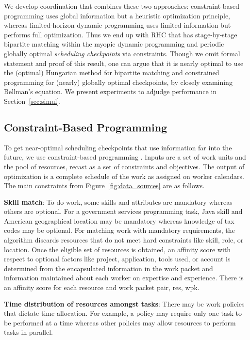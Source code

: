 \documentclass[10pt,journal,cspaper,compsoc]{IEEEtran}
\begin{document}
We develop coordination that combines these two approaches: 
constraint-based programming uses global information but a heuristic optimization principle, whereas 
limited-horizon dynamic programming uses limited information but performs full optimization.
Thus we end up with RHC that has stage-by-stage bipartite matching within the
myopic dynamic programming and periodic globally optimal \emph{scheduling checkpoints} via constraints.
Though we omit formal statement and proof of this result, one can argue  that 
it is nearly optimal to use the (optimal) Hungarian method for bipartite matching and constrained programming 
for (nearly) globally optimal checkpoints, by closely examining Bellman's equation.  We present experiments to adjudge 
performance in Section~\ref{sec:simul}. 

\subsection{Constraint-Based Programming}
To get near-optimal scheduling checkpoints that use information far into the future, we use 
constraint-based programming \cite{NavehRAGC2007,AsafERCGOM2010}. Inputs are a set of work units and the pool of resources,
recast as a set of constraints and objectives.  The output of optimization is a complete schedule of the work 
as assigned on worker calendars. The main constraints from Figure~\ref{fig:data_sources} are as follows.

{\bf Skill match}: To do work, some skills and attributes are mandatory whereas others are optional.  For a government services 
programming task, Java skill and American geographical location may be mandatory whereas knowledge of tax codes may be optional.
For matching work with mandatory requirements, the algorithm discards resources that do not meet hard constraints
like skill, role, or location.  Once the eligible set of resources is obtained, an affinity score with respect to optional factors 
like project, application, tools used, or account is determined from the encapsulated information in the work packet and 
information maintained about each worker on expertise and experience.  There is an affinity score for
each resource and work packet pair, res, wpk.

{\bf Time distribution of resources amongst tasks}: There may be work policies that dictate time allocation.  For example, a policy may 
require only one task to be performed at a time whereas other policies may allow resources to perform tasks in parallel.
\end{document}
